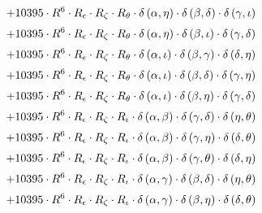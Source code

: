 \begin{subequations}
\begin{gather}
 \\[0.2em] \notag 		 + 10395 \cdot R^{6} \cdot R_{\epsilon{}} \cdot R_{\zeta{}} \cdot R_{\theta{}} \cdot \delta{}\left(\alpha{}, \eta{}\right) \cdot \delta{}\left(\beta{}, \delta{}\right) \cdot \delta{}\left(\gamma{}, \iota{}\right) 
 \\[0.2em] \notag 		 + 10395 \cdot R^{6} \cdot R_{\epsilon{}} \cdot R_{\zeta{}} \cdot R_{\theta{}} \cdot \delta{}\left(\alpha{}, \eta{}\right) \cdot \delta{}\left(\beta{}, \iota{}\right) \cdot \delta{}\left(\gamma{}, \delta{}\right) 
 \\[0.2em] \notag 		 + 10395 \cdot R^{6} \cdot R_{\epsilon{}} \cdot R_{\zeta{}} \cdot R_{\theta{}} \cdot \delta{}\left(\alpha{}, \iota{}\right) \cdot \delta{}\left(\beta{}, \gamma{}\right) \cdot \delta{}\left(\delta{}, \eta{}\right) 
 \\[0.2em] \notag 		 + 10395 \cdot R^{6} \cdot R_{\epsilon{}} \cdot R_{\zeta{}} \cdot R_{\theta{}} \cdot \delta{}\left(\alpha{}, \iota{}\right) \cdot \delta{}\left(\beta{}, \delta{}\right) \cdot \delta{}\left(\gamma{}, \eta{}\right) 
 \\[0.2em] \notag 		 + 10395 \cdot R^{6} \cdot R_{\epsilon{}} \cdot R_{\zeta{}} \cdot R_{\theta{}} \cdot \delta{}\left(\alpha{}, \iota{}\right) \cdot \delta{}\left(\beta{}, \eta{}\right) \cdot \delta{}\left(\gamma{}, \delta{}\right) 
 \\[0.2em] \notag 		 + 10395 \cdot R^{6} \cdot R_{\epsilon{}} \cdot R_{\zeta{}} \cdot R_{\iota{}} \cdot \delta{}\left(\alpha{}, \beta{}\right) \cdot \delta{}\left(\gamma{}, \delta{}\right) \cdot \delta{}\left(\eta{}, \theta{}\right) 
 \\[0.2em] \notag 		 + 10395 \cdot R^{6} \cdot R_{\epsilon{}} \cdot R_{\zeta{}} \cdot R_{\iota{}} \cdot \delta{}\left(\alpha{}, \beta{}\right) \cdot \delta{}\left(\gamma{}, \eta{}\right) \cdot \delta{}\left(\delta{}, \theta{}\right) 
 \\[0.2em] \notag 		 + 10395 \cdot R^{6} \cdot R_{\epsilon{}} \cdot R_{\zeta{}} \cdot R_{\iota{}} \cdot \delta{}\left(\alpha{}, \beta{}\right) \cdot \delta{}\left(\gamma{}, \theta{}\right) \cdot \delta{}\left(\delta{}, \eta{}\right) 
 \\[0.2em] \notag 		 + 10395 \cdot R^{6} \cdot R_{\epsilon{}} \cdot R_{\zeta{}} \cdot R_{\iota{}} \cdot \delta{}\left(\alpha{}, \gamma{}\right) \cdot \delta{}\left(\beta{}, \delta{}\right) \cdot \delta{}\left(\eta{}, \theta{}\right) 
 \\[0.2em] \notag 		 + 10395 \cdot R^{6} \cdot R_{\epsilon{}} \cdot R_{\zeta{}} \cdot R_{\iota{}} \cdot \delta{}\left(\alpha{}, \gamma{}\right) \cdot \delta{}\left(\beta{}, \eta{}\right) \cdot \delta{}\left(\delta{}, \theta{}\right) 

\end{gather}
\end{subequations}
